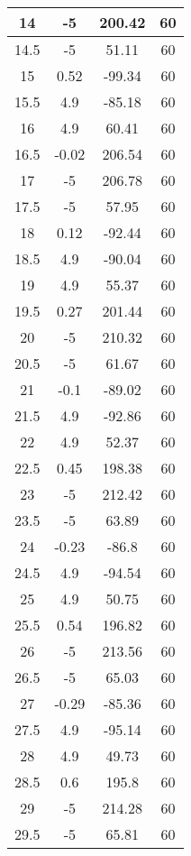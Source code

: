 \begin{longtable}[c]{|c|c|c|c|}
14  &	-5    &	200.42 &60 \\ \hline 
14.5&	-5    &	51.11  &60 \\ \hline 
15  &	0.52  &	-99.34 &60 \\ \hline 
15.5&	4.9   &	-85.18 &60 \\ \hline 
16  &	4.9   &	60.41  &60 \\ \hline 
16.5&	-0.02 &	206.54 &60 \\ \hline 
17  &	-5    &	206.78 &60 \\ \hline 
17.5&	-5    &	57.95  &60 \\ \hline 
18  &	0.12  &	-92.44 &60 \\ \hline 
18.5&	4.9   &	-90.04 &60 \\ \hline 
19  &	4.9   &	55.37  &60 \\ \hline 
19.5&	0.27  &	201.44 &60 \\ \hline 
20  &	-5    &	210.32 &60 \\ \hline 
20.5&	-5    &	61.67  &60 \\ \hline 
21  &	-0.1  &	-89.02 &60 \\ \hline 
21.5&	4.9   &	-92.86 &60 \\ \hline 
22  &	4.9   &	52.37  &60 \\ \hline 
22.5&	0.45  &	198.38 &60 \\ \hline 
23  &	-5    &	212.42 &60 \\ \hline 
23.5&	-5    &	63.89  &60 \\ \hline 
24  &	-0.23 &	-86.8  &60 \\ \hline 
24.5&	4.9   &	-94.54 &60 \\ \hline 
25  &	4.9   &	50.75  &60 \\ \hline 
25.5&	0.54  &	196.82 &60 \\ \hline 
26  &	-5    &	213.56 &60 \\ \hline 
26.5&	-5    &	65.03  &60 \\ \hline 
27  &	-0.29 &	-85.36 &60 \\ \hline 
27.5&	4.9   &	-95.14 &60 \\ \hline 
28  &	4.9   &	49.73  &60 \\ \hline 
28.5&	0.6   &	195.8  &60 \\ \hline 
29  &	-5    &	214.28 &60 \\ \hline 
29.5&	-5    &	65.81  &60 \\ \hline 
\end{longtable}






